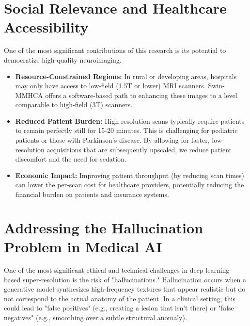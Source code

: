 \section{Social Relevance and Healthcare Accessibility}
One of the most significant contributions of this research is its potential to democratize high-quality neuroimaging. 
\begin{itemize}
    \item \textbf{Resource-Constrained Regions:} In rural or developing areas, hospitals may only have access to low-field (1.5T or lower) MRI scanners. Swin-MMHCA offers a software-based path to enhancing these images to a level comparable to high-field (3T) scanners.
    \item \textbf{Reduced Patient Burden:} High-resolution scans typically require patients to remain perfectly still for 15-20 minutes. This is challenging for pediatric patients or those with Parkinson's disease. By allowing for faster, low-resolution acquisitions that are subsequently upscaled, we reduce patient discomfort and the need for sedation.
    \item \textbf{Economic Impact:} Improving patient throughput (by reducing scan times) can lower the per-scan cost for healthcare providers, potentially reducing the financial burden on patients and insurance systems.
\end{itemize}

\section{Addressing the Hallucination Problem in Medical AI}
One of the most significant ethical and technical challenges in deep learning-based super-resolution is the risk of "hallucinations." Hallucination occurs when a generative model synthesizes high-frequency textures that appear realistic but do not correspond to the actual anatomy of the patient. In a clinical setting, this could lead to "false positives" (e.g., creating a lesion that isn't there) or "false negatives" (e.g., smoothing over a subtle structural anomaly).

